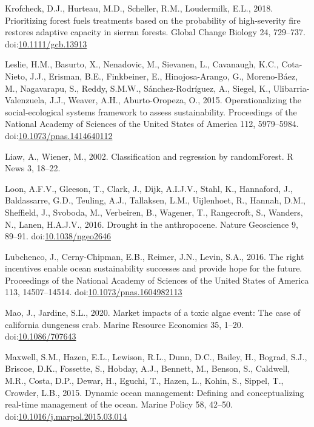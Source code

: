 \documentclass[]{elsarticle} %
\begin{document}
\leavevmode\hypertarget{ref-Krofcheck2018}{}%
Krofcheck, D.J., Hurteau, M.D., Scheller, R.M., Loudermilk, E.L., 2018.
Prioritizing forest fuels treatments based on the probability of
high-severity fire restores adaptive capacity in sierran forests. Global
Change Biology 24, 729--737.
doi:\href{https://doi.org/10.1111/gcb.13913}{10.1111/gcb.13913}

\leavevmode\hypertarget{ref-Leslie2015}{}%
Leslie, H.M., Basurto, X., Nenadovic, M., Sievanen, L., Cavanaugh, K.C.,
Cota-Nieto, J.J., Erisman, B.E., Finkbeiner, E., Hinojosa-Arango, G.,
Moreno-Báez, M., Nagavarapu, S., Reddy, S.M.W., Sánchez-Rodríguez, A.,
Siegel, K., Ulibarria-Valenzuela, J.J., Weaver, A.H., Aburto-Oropeza,
O., 2015. Operationalizing the social-ecological systems framework to
assess sustainability. Proceedings of the National Academy of Sciences
of the United States of America 112, 5979--5984.
doi:\href{https://doi.org/10.1073/pnas.1414640112}{10.1073/pnas.1414640112}

\leavevmode\hypertarget{ref-Wiener2003}{}%
Liaw, A., Wiener, M., 2002. Classification and regression by
randomForest. R News 3, 18--22.

\leavevmode\hypertarget{ref-VanLoon2016}{}%
Loon, A.F.V., Gleeson, T., Clark, J., Dijk, A.I.J.V., Stahl, K.,
Hannaford, J., Baldassarre, G.D., Teuling, A.J., Tallaksen, L.M.,
Uijlenhoet, R., Hannah, D.M., Sheffield, J., Svoboda, M., Verbeiren, B.,
Wagener, T., Rangecroft, S., Wanders, N., Lanen, H.A.J.V., 2016. Drought
in the anthropocene. Nature Geoscience 9, 89--91.
doi:\href{https://doi.org/10.1038/ngeo2646}{10.1038/ngeo2646}

\leavevmode\hypertarget{ref-Lubchenco2016}{}%
Lubchenco, J., Cerny-Chipman, E.B., Reimer, J.N., Levin, S.A., 2016. The
right incentives enable ocean sustainability successes and provide hope
for the future. Proceedings of the National Academy of Sciences of the
United States of America 113, 14507--14514.
doi:\href{https://doi.org/10.1073/pnas.1604982113}{10.1073/pnas.1604982113}

\leavevmode\hypertarget{ref-Mao2020}{}%
Mao, J., Jardine, S.L., 2020. Market impacts of a toxic algae event: The
case of california dungeness crab. Marine Resource Economics 35, 1--20.
doi:\href{https://doi.org/10.1086/707643}{10.1086/707643}

\leavevmode\hypertarget{ref-Maxwell2015}{}%
Maxwell, S.M., Hazen, E.L., Lewison, R.L., Dunn, D.C., Bailey, H.,
Bograd, S.J., Briscoe, D.K., Fossette, S., Hobday, A.J., Bennett, M.,
Benson, S., Caldwell, M.R., Costa, D.P., Dewar, H., Eguchi, T., Hazen,
L., Kohin, S., Sippel, T., Crowder, L.B., 2015. Dynamic ocean
management: Defining and conceptualizing real-time management of the
ocean. Marine Policy 58, 42--50.
doi:\href{https://doi.org/10.1016/j.marpol.2015.03.014}{10.1016/j.marpol.2015.03.014}
\end{document}
